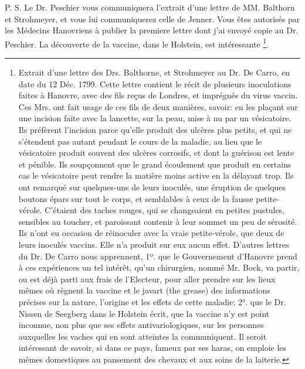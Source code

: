 P. S. Le Dr. Peschier vous communiquera l'extrait d'une lettre de MM. Balthorn et Strohmeyer, et vous lui communiquerez celle de Jenner. Vous êtes autorisés par les Médecins Hanovriens à publier la premiere lettre dont\setcounter{page}{194} j'ai envoyé copie au Dr. Peschier. La découverte de la vaccine, dans le Holstein, est intéressante \footnote{Extrait d'une lettre des Drs. Balthorne, et Strohmeyer au Dr. De Carro, en date du 12 Déc. 1799.
Cette lettre contient le récit de plusieurs inoculations faites à Hanovre, avec des fils reçus de Londres, et imprégnés du virus vaccin. Ces Mrs. ont fait usage de ces fils de deux manières, savoir: en les plaçant sur une incision faite avec la lancette, sur la peau, mise à nu par un vésicatoire. Ils préfèrent l'incision parce qu'elle produit des ulcères plus petits, et qui ne s'étendent pas autant pendant le cours de la maladie, au lieu que le vésicatoire produit souvent des ulcères corrosifs, et dont la guérison est lente et pénible. Ils soupçonnent que le grand écoulement que produit en certains cas le vésicatoire peut rendre la matière moins active en la délayant trop. Ils ont remarqué sur quelques-uns de leurs inoculés, une éruption de quelques boutons épars sur tout le corps, et semblables à ceux de la fausse petite-vérole. C'étaient des taches rouges, qui se changeaient en petites pustules, sensibles au toucher, et paroissant contenir à leur sommet un peu de sérosité. Ils n'ont eu occasion de réinoculer avec la vraie petite-vérole, que deux de leurs inoculés vaccins. Elle n'a produit sur eux aucun effet.
D'autres lettres du Dr. De Carro nous apprennent, 1º. que le Gouvernement d'Hanovre prend à ces expériences un tel intérêt, qu'un chirurgien, nommé Mr. Bock, va partir, ou est déjà parti aux frais de l'Electeur, pour aller prendre sur les lieux mêmes où règnent la vaccine et le javart (the grease) des informations précises sur la nature, l'origine et les effets de cette maladie; 2°. que le Dr. Nissen de Seegberg dans le Holstein écrit, que la vaccine n'y est point inconnue, non plus que ses effets antivariologiques, sur les personnes auxquelles les vaches qui en sont atteintes la communiquent. Il seroit intéressant de savoir, si dans ce pays, fameux par ses haras, on emploie les mêmes domestiques au pansement des chevaux et aux soins de la laiterie.}.
